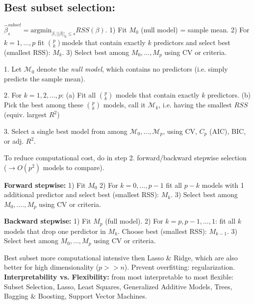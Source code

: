 \subsection*{Best subset selection:}
$\hat\beta_s^{subset} = \text{argmin}_{\beta, ||\beta||_0 \leq s} RSS(\beta)$. 1) Fit $M_0$ (null model) = sample mean. 2) For $k=1,...,p$ fit $\binom p k$models that contain exactly $k$ predictors and select best (smallest RSS): $M_k$. 3) Select best among $M_0, ..., M_p$ using CV or criteria.

1. Let $\mathcal{M}_0$ denote the \textit{null model}, which contains no predictors (i.e. simply predicts the sample mean).

2. For $k=1,2,...,p$: (a) Fit all $\binom{p}{k}$ models that contain exactly $k$ predictors. (b) Pick the best among these $\binom{p}{k}$ models, call it $\mathcal{M}_k$, i.e. having the smallest $RSS$ (equiv. largest $R^2$)

3. Select a single best model from among $\mathcal{M}_0,..., \mathcal{M}_p$, using CV, $C_p$ (AIC), BIC, or adj. $R^2$.

To reduce computational cost, do in step 2. forward/backward stepwise selection ($\rightarrow O(p^2)$ models to compare).

\textbf{Forward stepwise:} 
1) Fit $M_0$ 
2) For $k=0,...,p-1$ fit all $p-k$ models with 1 additional predictor and select best (smallest RSS): $M_k$. 
3) Select best among $M_0,....,M_p$ using CV or criteria.

\textbf{Backward stepwise:} 
1) Fit $M_p$ (full model). 
2) For $k=p,p-1,...,1$: fit all $k$ models that drop one perdictor in $M_k$. Choose best (smallest RSS): $M_{k-1}$. 
3) Select best among $M_0,...,M_p$ using CV or criteria.

Best subset more computational intensive then Lasso \& Ridge, which are also better for high dimensionality ($p >> n$). Prevent overfitting: regularization.
\textbf{Interpretability vs. Flexibility:} from most interpretable to most flexible: Subset Selection, Lasso, Least Squares, Generalized Additive Models, Trees, Bagging \& Boosting, Support Vector Machines.

